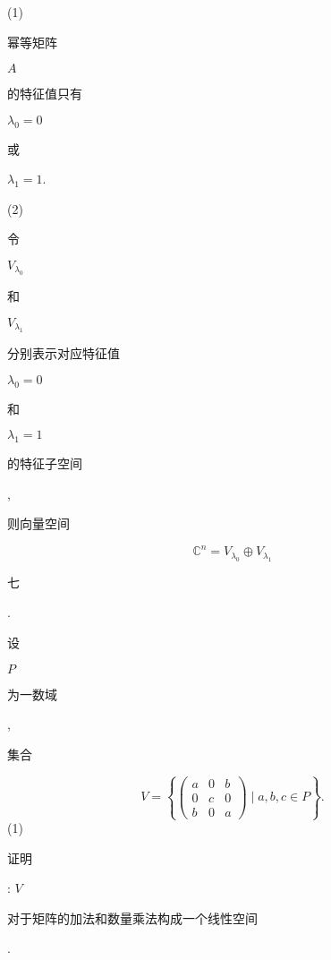 \documentclass[10pt]{article}
\begin{document}
(1) \begin{CJK}{UTF8}{mj}幂等矩阵\end{CJK} $A$ \begin{CJK}{UTF8}{mj}的特征值只有\end{CJK} $\lambda_{0}=0$ \begin{CJK}{UTF8}{mj}或\end{CJK} $\lambda_{1}=1$.

(2) \begin{CJK}{UTF8}{mj}令\end{CJK} $V_{\lambda_{0}}$ \begin{CJK}{UTF8}{mj}和\end{CJK} $V_{\lambda_{1}}$ \begin{CJK}{UTF8}{mj}分别表示对应特征值\end{CJK} $\lambda_{0}=0$ \begin{CJK}{UTF8}{mj}和\end{CJK} $\lambda_{1}=1$ \begin{CJK}{UTF8}{mj}的特征子空间\end{CJK}, \begin{CJK}{UTF8}{mj}则向量空间\end{CJK}
$$
\mathbb{C}^{n}=V_{\lambda_{0}} \oplus V_{\lambda_{1}}
$$
\begin{CJK}{UTF8}{mj}七\end{CJK}. \begin{CJK}{UTF8}{mj}设\end{CJK} $P$ \begin{CJK}{UTF8}{mj}为一数域\end{CJK}, \begin{CJK}{UTF8}{mj}集合\end{CJK}
$$
V=\left\{\left(\begin{array}{lll}
a & 0 & b \\
0 & c & 0 \\
b & 0 & a
\end{array}\right) \mid a, b, c \in P\right\} .
$$
(1) \begin{CJK}{UTF8}{mj}证明\end{CJK}: $V$ \begin{CJK}{UTF8}{mj}对于矩阵的加法和数量乘法构成一个线性空间\end{CJK}.
\end{document}
